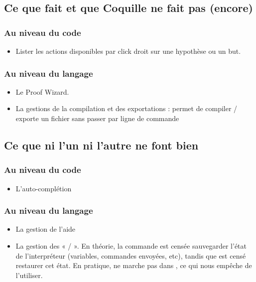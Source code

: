     \subsection{Ce que \coqide fait et que Coquille ne fait pas (encore)}
    
        \subsubsection{Au niveau du code}

            \begin{itemize}
                \item Lister les actions disponibles par click droit sur une hypothèse ou un but.
            \end{itemize}

        \subsubsection{Au niveau du langage}
        
            \begin{itemize}
                \item Le Proof Wizard.
                \item La gestions de la compilation et des exportations : \coqide permet de compiler / exporte un fichier sans passer par ligne de commande
            \end{itemize}

    \subsection{Ce que ni l'un ni l'autre ne font bien}

        \subsubsection{Au niveau du code}

            \begin{itemize}
                \item L'auto-complétion
            \end{itemize}

        \subsubsection{Au niveau du langage}
        
            \begin{itemize}
                \item La gestion de l'aide
                \item La gestion des «  /  ».
                En théorie, la commande  est censée sauvegarder l'état de l'interpréteur (variables, commandes envoyées, etc), tandis que  est censé restaurer cet état.
			    En pratique,  ne marche pas dans \coqtop, ce qui nous empêche de l'utiliser.
            \end{itemize}


